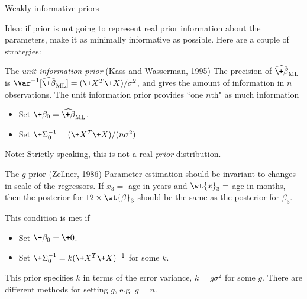 \documentclass[10pt]{beamer}
\begin{document}
\begin{frame}{Weakly informative priors}

\scriptsize  Idea: if prior is not going to represent real prior information about the parameters, make it as minimally informative as possible.   Here are a couple of strategies:
\pause 
\vfill 
\begin{sblock}{The \textit{unit information prior} \hfill \tiny (Kass and Wasserman, 1995) }	
\scriptsize The precision of $\widehat{\+\beta}_{\text{ML}}$ is  $\Var^{-1} [\widehat{\+\beta}_{\text{ML}}] = (\+X^T\+X)/ \sigma^2$, and gives the amount of information in $n$ observations.  The unit information prior provides ``one $n$th" as much information 

\begin{itemize}
\item Set $\+\beta_0 = \widehat{\+\beta}_{\text{ML}}$.
\item Set $\+\Sigma_0^{-1} = (\+X^T\+X)/ (n\sigma^2)$
\end{itemize}

{\tiny Note: Strictly speaking, this is not a real \textit{prior} distribution.}
\end{sblock}

\pause 
\begin{sblock}{The $g$-prior \hfill \tiny (Zellner, 1986)}
Parameter estimation should be invariant to changes in scale of the regressors.  If $x_3 =$ age in years and $\wt{x}_3=$ age in months, then the posterior for $12 \times \wt{\beta}_3$ should be the same as the posterior for $\beta_3$. 

This condition is met if 
\begin{itemize}
\item Set $\+\beta_0 = \+0$.
\item Set $\+\Sigma_0^{-1} = k (\+X^T\+X)^{-1}$ for some $k$.
\end{itemize}

This prior specifies $k$ in terms of the error variance, $k=g \sigma^2$ for some $g$.  There are different methods for setting $g$, e.g. $g=n$.
\end{sblock}

\end{frame}
\end{document}
